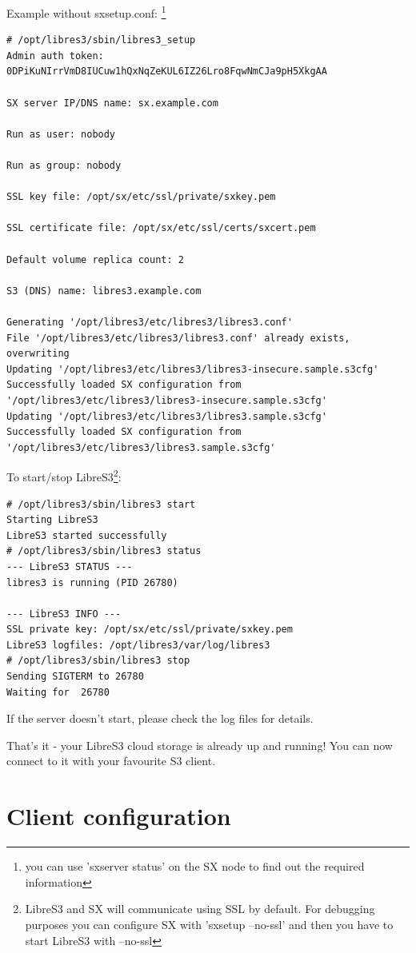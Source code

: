Example without sxsetup.conf:
\footnote{you can use 'sxserver status' on the SX node to find out the required information}
\small
\begin{lstlisting}
# /opt/libres3/sbin/libres3_setup
Admin auth token:
0DPiKuNIrrVmD8IUCuw1hQxNqZeKUL6IZ26Lro8FqwNmCJa9pH5XkgAA

SX server IP/DNS name: sx.example.com

Run as user: nobody

Run as group: nobody

SSL key file: /opt/sx/etc/ssl/private/sxkey.pem

SSL certificate file: /opt/sx/etc/ssl/certs/sxcert.pem

Default volume replica count: 2

S3 (DNS) name: libres3.example.com

Generating '/opt/libres3/etc/libres3/libres3.conf'
File '/opt/libres3/etc/libres3/libres3.conf' already exists, overwriting
Updating '/opt/libres3/etc/libres3/libres3-insecure.sample.s3cfg'
Successfully loaded SX configuration from '/opt/libres3/etc/libres3/libres3-insecure.sample.s3cfg'
Updating '/opt/libres3/etc/libres3/libres3.sample.s3cfg'
Successfully loaded SX configuration from '/opt/libres3/etc/libres3/libres3.sample.s3cfg'
\end{lstlisting}
\LARGE

To start/stop LibreS3\footnote{LibreS3 and SX will communicate using SSL by
default. For debugging purposes you can configure SX with 'sxsetup --no-ssl' and then you have to start LibreS3 with --no-ssl}:

\small
\begin{lstlisting}
# /opt/libres3/sbin/libres3 start
Starting LibreS3
LibreS3 started successfully
# /opt/libres3/sbin/libres3 status
--- LibreS3 STATUS ---
libres3 is running (PID 26780)

--- LibreS3 INFO ---
SSL private key: /opt/sx/etc/ssl/private/sxkey.pem
LibreS3 logfiles: /opt/libres3/var/log/libres3
# /opt/libres3/sbin/libres3 stop
Sending SIGTERM to 26780
Waiting for  26780
\end{lstlisting}
\LARGE

If the server doesn't start, please check the log files for details.

That's it - your LibreS3 cloud storage is already up and running!
You can now connect to it with your favourite S3 client.

\chapter{Client configuration}
